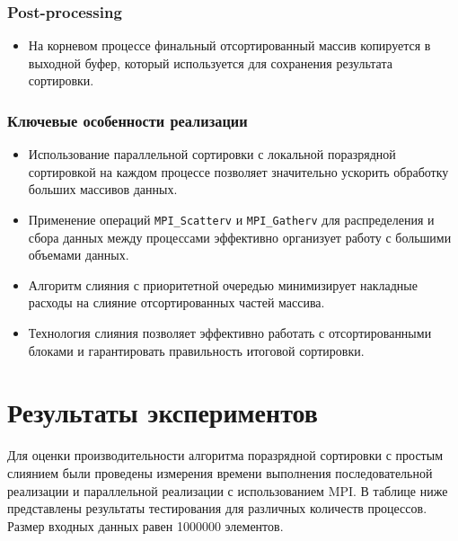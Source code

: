 \documentclass[12pt]{article}
\begin{document}
\subsubsection*{Post-processing}
\begin{itemize}
    \item На корневом процессе финальный отсортированный массив копируется в выходной буфер, который используется для сохранения результата сортировки.
\end{itemize}

\subsubsection*{Ключевые особенности реализации}
\begin{itemize}
    \item Использование параллельной сортировки с локальной поразрядной сортировкой на каждом процессе позволяет значительно ускорить обработку больших массивов данных.
    \item Применение операций \texttt{MPI\_Scatterv} и \texttt{MPI\_Gatherv} для распределения и сбора данных между процессами эффективно организует работу с большими объемами данных.
    \item Алгоритм слияния с приоритетной очередью минимизирует накладные расходы на слияние отсортированных частей массива.
    \item Технология слияния позволяет эффективно работать с отсортированными блоками и гарантировать правильность итоговой сортировки.
\end{itemize}

\newpage

\section*{Результаты экспериментов}

\hspace*{1.25em}Для оценки производительности алгоритма поразрядной сортировки с простым слиянием были проведены измерения времени выполнения последовательной реализации и параллельной реализации с использованием MPI. В таблице ниже представлены результаты тестирования для различных количеств процессов. Размер входных данных равен 1000000 элементов.
\end{document}
